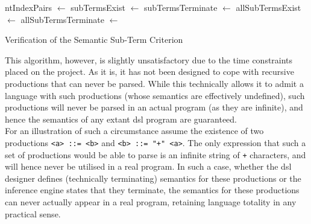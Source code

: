 \begin{algorithm}[!htb]
\begin{algorithmic}
    \State ntIndexPairs $\gets$ 
    \State subTermsExist $\gets$ 
    \State subTermsTerminate $\gets$ 
    \State allSubTermsExist $\gets$ 
    \State allSubTermsTerminate $\gets$ 
        \State {}
    \Else
        \State {}
    \EndIf
\EndFunction
\end{algorithmic}
\caption{Verification of the Semantic Sub-Term Criterion}
\label{alg:verification_of_the_semantic_sub_term_criterion}
\end{algorithm}

This algorithm, however, is slightly unsatisfactory due to the time constraints placed on the project. 
As it is, it has not been designed to cope with recursive productions that can never be parsed. 
While this technically allows it to admit a language with such productions (whose semantics are effectively undefined), such productions will never be parsed in an actual program (as they are infinite), and hence the semantics of any extant \gls{dsl} program are guaranteed.\\

For an illustration of such a circumstance assume the existence of two productions \texttt{<a> ::= <b>} and \texttt{<b> ::= "+" <a>}. 
The only expression that such a set of productions would be able to parse is an infinite string of \texttt{+} characters, and will hence never be utilised in a real program.
In such a case, whether the \gls{dsl} designer defines (technically terminating) semantics for these productions or the inference engine states that they terminate, the semantics for these productions can never actually appear in a real program, retaining language totality in any practical sense. 


